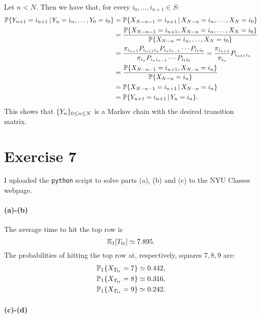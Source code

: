 \documentclass[a4paper,11pt]{article}
\theoremstyle{definition}
\theoremstyle{plain}
\theoremstyle{remark}
\DeclarePairedDelimiter{\parq}{[}{]}
\DeclarePairedDelimiter{\bra}{\lbrace}{\rbrace}
\begin{document}
Let $n<N$. Then we have that, for every $i_0,\dots,i_{n+1}\in S$:
\begin{align*}
\mathbb{P}\bra{Y_{n+1}=i_{n+1}\,|\,Y_n=i_n,\dots,Y_0=i_0} & = \mathbb{P}\bra{X_{N-n-1}=i_{n+1}\,|\,X_{N-n}=i_n,\dots,X_N=i_0} \\
& = \frac{\mathbb{P}\bra{X_{N-n-1}=i_{n+1},X_{N-n}=i_n,\dots,X_N=i_0}}{\mathbb{P}\bra{X_{N-n}=i_n,\dots,X_N=i_0}} \\ & = 
\frac{\pi_{i_{n+1}}P_{i_{n+1}i_n}P_{i_ni_{n-1}}\cdots P_{i_1i_0}}{\pi_{i_n}P_{i_ni_{n-1}}\cdots P_{i_1i_0}} = 
\frac{\pi_{i_{n+1}}}{\pi_{i_n}}P_{i_{n+1}i_n} \\ & = \frac{\mathbb{P}\bra{X_{N-n-1}=i_{n+1},X_{N-n}=i_n}}{\mathbb{P}\bra{X_{N-n}=i_n}} \\ & = \mathbb{P}\bra{X_{N-n-1}=i_{n+1}\,|\,X_{N-n}=i_n} \\ & = \mathbb{P}\bra{Y_{n+1}=i_{n+1}\,|\,Y_n=i_n}.
\end{align*}
This shows that $\bra{Y_n}_{0\leq n\leq N}$ is a Markov chain with the desired transition matrix.

\section*{Exercise 7}

I uploaded the \texttt{python} script to solve parts (a), (b) and (c) to the NYU Classes webpage.

\paragraph*{(a)-(b)}

The average time to hit the top row is 
$$
\mathbb{E}_1\parq{T_\mathrm{tr}} \simeq 7.895.
$$
The probabilities of hitting the top row at, respectively, squares $7,8,9$ are:
\begin{align*}
\mathbb{P}_1\bra{X_{T_\mathrm{tr}} = 7} & \simeq 0.442, \\
\mathbb{P}_1\bra{X_{T_\mathrm{tr}} = 8} & \simeq 0.316, \\
\mathbb{P}_1\bra{X_{T_\mathrm{tr}} = 9} & \simeq 0.242.
\end{align*}

\paragraph*{(c)-(d)}
\end{document}
